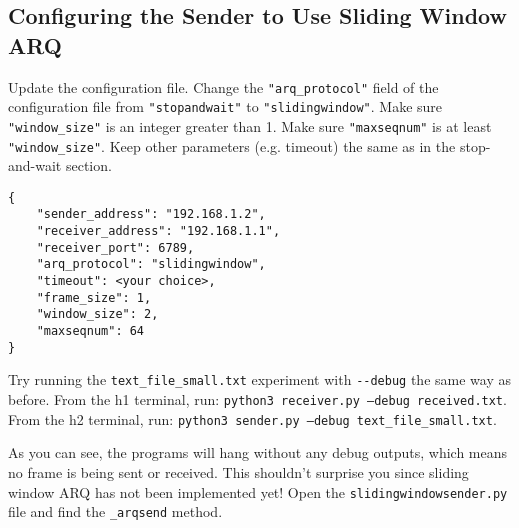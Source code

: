 \documentclass[11pt]{article}
\begin{document}
\subsection{Configuring the Sender to Use Sliding Window ARQ}
\label{subsec:config-file-slidingwindow}
Update the configuration file.
Change the \texttt{"arq\_protocol"} field of the configuration file from \texttt{"stopandwait"} to \texttt{"slidingwindow"}.
Make sure \texttt{"window\_size"} is an integer greater than 1.
Make sure \texttt{"maxseqnum"} is at least \texttt{"window\_size"}.
Keep other parameters (e.g. timeout) the same as in the stop-and-wait section.
\begin{lstlisting}[style=ece361-shell-base, caption={Sliding Window Configuration}]
{
    "sender_address": "192.168.1.2",
    "receiver_address": "192.168.1.1",
    "receiver_port": 6789,
    "arq_protocol": "slidingwindow",
    "timeout": <your choice>,
    "frame_size": 1,
    "window_size": 2,
    "maxseqnum": 64
}
\end{lstlisting}


Try running the \texttt{text\_file\_small.txt} experiment with \texttt{-{}-debug} the same way as before.
From the h1 terminal, run: \texttt{python3 receiver.py --debug received.txt}.
From the h2 terminal, run: \texttt{python3 sender.py --debug text\_file\_small.txt}.

As you can see, the programs will hang without any debug outputs, which means no frame is being sent or received.
This shouldn't surprise you since sliding window ARQ has not been implemented yet!
Open the \texttt{slidingwindowsender.py} file and find the \texttt{\_arqsend} method.
\end{document}
